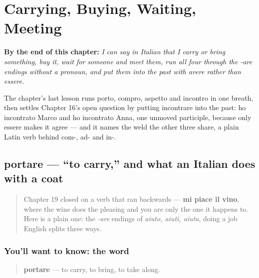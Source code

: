 
\chapter{Carrying, Buying, Waiting, Meeting}
\label{ch:it-carry-buy-wait-meet}

\begin{chapteropening}
\textbf{By the end of this chapter:} \emph{I can say in Italian that I carry or bring something, buy it, wait for someone and meet them, run all four through the -are endings without a pronoun, and put them into the past with avere rather than essere.}

The chapter's last lesson runs porto, compro, aspetto and incontro in one breath, then settles Chapter 16's open question by putting incontrare into the past: ho incontrato Marco and ho incontrato Anna, one unmoved participle, because only essere makes it agree — and it names the weld the other three share, a plain Latin verb behind com-, ad- and in-.
\end{chapteropening}

\section[portare]{portare — \textquotedblleft{}to carry,\textquotedblright{} and what an Italian does with a coat}

\label{lesson:IT-C20-portare}



\begin{quote}
Chapter 19 closed on a verb that ran backwards — \textbf{mi piace il vino}, where the wine does the pleasing and you are only the one it happens to. Here is a plain one: the \emph{-are} endings of \emph{aiuto, aiuti, aiuta}, doing a job English splits three ways.
\end{quote}

\subsection*{You'll want to know: the word}
\begin{quote}
\textbf{portare} — to carry, to bring, to take along.
\end{quote}

